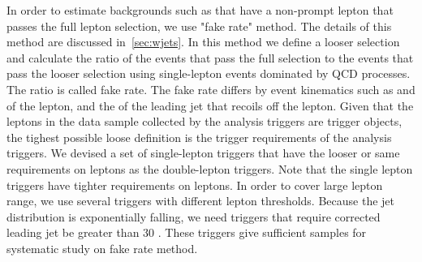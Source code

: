 In order to estimate backgrounds such as \wjets{} that have a non-prompt 
lepton that passes the full lepton selection, we use "fake rate" method.  
The details of this method are discussed in~\ref{sec:wjets}. 
In this method we define a looser selection and calculate the ratio of the 
events that pass the full selection to the events that pass the looser 
selection using single-lepton events dominated by QCD processes. 
The ratio is called fake rate. The fake rate differs by event kinematics
such as \pt{} and \Eta{} of the lepton, and the \pt{} of the leading jet 
that recoils off the lepton. Given that the leptons in the data sample
collected by the analysis triggers are trigger objects, the tighest possible 
loose definition is the trigger requirements of the analysis triggers.
We devised a set of single-lepton triggers that have the looser or same requirements 
on leptons as the double-lepton triggers. Note that the single lepton triggers 
have tighter requirements on leptons. In order to cover large lepton \pt{} range, 
we use several triggers with different lepton \pt{} thresholds.
Because the jet \pt{} distribution is exponentially falling, 
we need triggers that require corrected leading jet \pt{} be greater than 30 \GeV. 
These triggers give sufficient samples for systematic study on fake rate method. 



